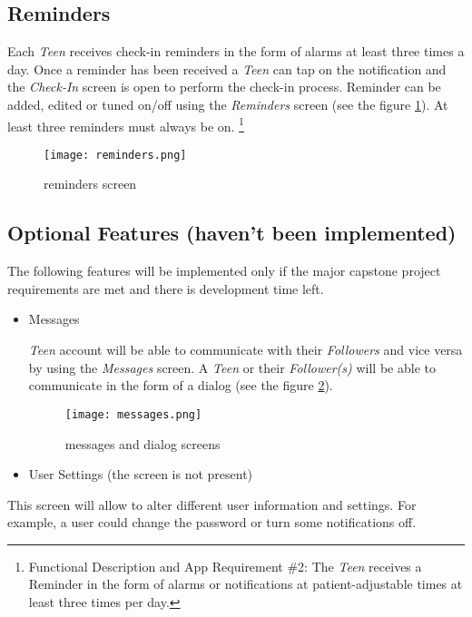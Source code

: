 \documentclass{article}
\begin{document}
\newpage

    \subsection{Reminders}

    Each \emph{Teen} receives check-in reminders in the form of alarms at least three times a day. Once a reminder has been received a \emph{Teen} can tap on the notification and the \emph{Check-In} screen is  open to perform the check-in process.
    Reminder can be added, edited or tuned on/off  using the \emph{Reminders} screen (see the figure \ref{fig:screen_reminders}). At least three reminders must always be on.
    \footnote{Functional Description and App Requirement \#2: The \emph{Teen} receives a Reminder in the form of alarms or notifications at patient-adjustable times at least three times per day.}

    \begin{figure}[h]
        \centering
        \texttt{[image: reminders.png]}
        \caption{reminders screen}
        \label{fig:screen_reminders}
    \end{figure}

\newpage

    \subsection{Optional Features (haven't been implemented)}

    The following features will be implemented only if the major capstone project requirements are met and there is development time left.

    \begin{itemize}
        \item Messages

            \emph{Teen} account will be able to communicate with their \emph{Followers} and vice versa by using the \emph{Messages} screen. A \emph{Teen} or their \emph{Follower(s)} will be able to communicate in the form of a dialog (see the figure \ref{fig:screen_messages}).


            \begin{figure}[h]
                \centering
                \texttt{[image: messages.png]}
                \caption{messages and dialog screens}
                \label{fig:screen_messages}
            \end{figure}

        \item User Settings (the screen is not present)
    \end{itemize}
            This screen will allow to alter different user information and settings. For example, a user could change the password or turn some notifications off.
\end{document}
